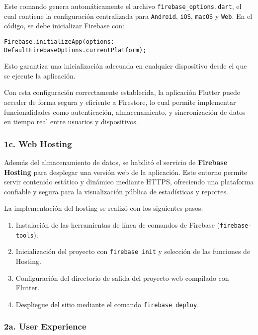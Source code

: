 Este comando genera automáticamente el archivo \texttt{firebase\_options.dart}, el cual contiene la configuración centralizada para \texttt{Android}, \texttt{iOS}, \texttt{macOS} y \texttt{Web}. En el código, se debe inicializar Firebase con:

\begin{center}
  \texttt{Firebase.initializeApp(options: DefaultFirebaseOptions.currentPlatform);}
\end{center}

Esto garantiza una inicialización adecuada en cualquier dispositivo desde el que se ejecute la aplicación.

\vspace{1em}

Con esta configuración correctamente establecida, la aplicación Flutter puede acceder de forma segura y eficiente a Firestore, lo cual permite implementar funcionalidades como autenticación, almacenamiento, y sincronización de datos en tiempo real entre usuarios y dispositivos.


\subsubsection{1c. Web Hosting}
Además del almacenamiento de datos, se habilitó el servicio de \textbf{Firebase Hosting} para desplegar una versión web de la aplicación. Este entorno permite servir contenido estático y dinámico mediante HTTPS, ofreciendo una plataforma confiable y segura para la visualización pública de estadísticas y reportes.

La implementación del hosting se realizó con los siguientes pasos:

\begin{enumerate}
    \item Instalación de las herramientas de línea de comandos de Firebase (\texttt{firebase-tools}).
    \item Inicialización del proyecto con \texttt{firebase init} y selección de las funciones de Hosting.
    \item Configuración del directorio de salida del proyecto web compilado con Flutter.
    \item Despliegue del sitio mediante el comando \texttt{firebase deploy}.
\end{enumerate}






\subsubsection{2a. User Experience}

